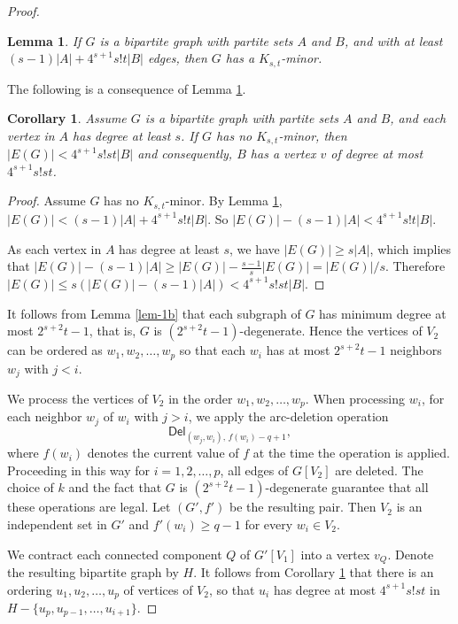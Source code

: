 \documentclass[11pt,a4paper]{article}
\newtheorem{lem}{Lemma}
\newtheorem{cor}{Corollary}
\theoremstyle{definition}
\newcommand{\ed}{\textsf{Del}}
\begin{document}
\begin{proof}
 

\begin{lem}
	\label{lem-2}
If $G$ is a bipartite graph with partite sets $A$ and $B$, and with at least $(s-1)|A|+4^{s+1}s!t|B|$ edges, then $G$ has a $K_{s,t}$-minor.
\end{lem}

The following is a consequence of  Lemma \ref{lem-2}.

\begin{cor}
	\label{cor-1}
	Assume $G$ is a bipartite graph with partite sets $A$ and $B$, and each vertex in $A$ has degree at least $s$. If $G$ has no $K_{s,t}$-minor, then $|E(G)| < 4^{s+1}s! st|B|$ and consequently, $B$ has a vertex $v$ of degree at most $4^{s+1}s! st$.
\end{cor}
\begin{proof}
	Assume $G$ has no $K_{s,t}$-minor. By Lemma \ref{lem-2}, $|E(G)| < (s-1)|A|+4^{s+1}s!t|B|$. 
	So $|E(G)| - (s-1)|A| < 4^{s+1}s!t|B|$. 
	
	As each vertex in $A$ has degree at least $s$, we have $|E(G)| \ge s|A|$, which implies that $|E(G)| - (s-1)|A| \ge |E(G)|- \frac{s-1}{s}|E(G)| = |E(G)|/s$. Therefore 
	$|E(G)|  \le s (|E(G)| - (s-1)|A|) < 4^{s+1}s! st|B|$.
\end{proof}
		
	 

It follows from Lemma \ref{lem-1b} that each subgraph of $G$ has minimum degree at most $2^{s+2}t-1$, that is, $G$ is $(2^{s+2}t-1)$-degenerate. Hence the vertices of $V_2$ can be ordered as 
  $w_1,w_2, \ldots, w_p$  so that each $w_i$ has at most $2^{s+2}t-1$ neighbors $w_j$ with $j < i$.

We process the vertices of $V_2$ in the order
$w_1,w_2,\ldots,w_p$. When processing $w_i$, for each neighbor $w_j$ of $w_i$ with $j>i$, we apply the arc-deletion operation
$$
\ed_{(w_j,w_i),\,f(w_i)-q+1},
$$
where $f(w_i)$ denotes the current value of $f$ at the time the operation is applied. Proceeding in this way for
$i=1,2,\ldots,p$, all edges of $G[V_2]$ are deleted.
The choice of $k$ and the fact that $G$ is $(2^{s+2}t-1)$-degenerate guarantee that
all these operations are legal. Let $(G',f')$ be the resulting
pair. Then $V_2$ is an independent set in $G'$ and
$f'(w_i)\ge q-1$ for every $w_i\in V_2$.


 
We contract each connected component $Q$ of  $G'[V_1]$ into a vertex $v_Q$. Denote the resulting bipartite graph by  $H$. It follows from Corollary \ref{cor-1} that there is an ordering
  $u_1,u_2, \ldots, u_p$ of vertices of $V_2$, so that $u_i$ has degree at most  $ 4^{s+1}s!st$ in $H-\{u_p, u_{p-1}, \ldots, u_{i+1}\}$.



\end{proof}
\end{document}
